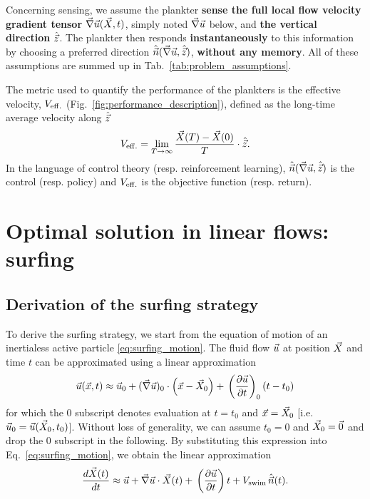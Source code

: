 Concerning sensing, we assume the plankter \textbf{sense the full local flow velocity gradient tensor} $\vec{\nabla} \vec{u} (\vec{X}, t)$, simply noted $\vec{\nabla} \vec{u}$ below, and \textbf{the vertical direction} $\hat{\vec{z}}$.
The plankter then responds \textbf{instantaneously} to this information by choosing a preferred direction $\hat{\vec{n}}(\vec{\nabla} \vec{u},\hat{\vec{z}})$, \textbf{without any memory}.
All of these assumptions are summed up in Tab.~\ref{tab:problem_assumptions}.

The metric used to quantify the performance of the plankters is the effective velocity, $V_{\mathrm{eff.}}$ (Fig.~\ref{fig:performance_description}), defined as the long-time average velocity along $\hat{\vec{z}}$
\begin{equation}
	\label{eq:surfing_performance}
	V_{\mathrm{eff.}} = \lim_{T\to\infty} \frac{\vec{X} (T) - \vec{X} (0)}{T} \cdot \hat{\vec{z}}.
\end{equation}
In the language of control theory (resp. reinforcement learning), $\hat{\vec{n}}(\vec{\nabla} \vec{u},\hat{\vec{z}})$ is the control (resp. policy) and $V_{\mathrm{eff.}}$ is the objective function (resp. return).

\section{Optimal solution in linear flows: surfing}\label{sec:the_surfing_strategy_derivation}

\subsection{Derivation of the surfing strategy}\label{sec:the_surfing_strategy_derivation}

To derive the surfing strategy, we start from the equation of motion of an inertialess active particle \eqref{eq:surfing_motion}.
The fluid flow $\vec{u}$ at position $\vec{X}$ and time $t$ can be approximated using a linear approximation
\begin{equation}
	\label{eq:surfing_linear}
	\vec{u} (\vec{x}, t) \approx \vec{u}_0 + (\vec{\nabla} \vec{u})_0 \cdot \left(\vec{x}  - \vec{X}_0\right)+ \, \left(\frac{\partial \vec{u}}{\partial t} \right)_0 \left( t - t_0\right)
\end{equation}
for which the $0$ subscript denotes evaluation at $t = t_0$ and $\vec{x} = \vec{X}_0$ [i.e. $\vec{u}_0 = \vec{u}(\vec{X}_0, t_0)$].
Without loss of generality, we can assume $t_0 = 0$ and $\vec{X}_0 = \vec{0}$ and drop the $0$ subscript in the following. 
By substituting this expression into Eq.~\eqref{eq:surfing_motion}, we obtain the linear approximation
\begin{equation}
	\label{eq:surfing_linear_motion}
	 \frac{d \vec{X}(t)}{d t} \approx \vec{u} + \vec{\nabla} \vec{u} \cdot \vec{X}(t)
	 + \, \left(\frac{\partial \vec{u}}{\partial t} \right) t + V_{\mathrm{swim}} \,\hat{\vec{n}}(t).
\end{equation}

